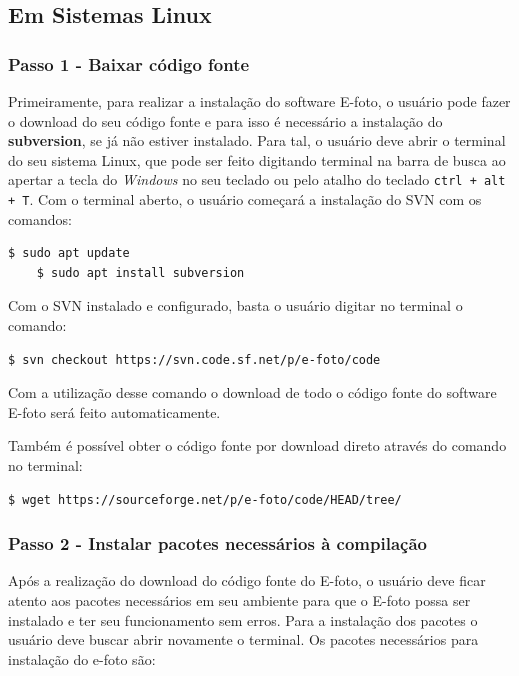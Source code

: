 \subsection{Em Sistemas Linux}

\subsubsection{Passo 1 - Baixar código fonte}
Primeiramente, para realizar a instalação do software E-foto, o usuário pode fazer o download do seu código fonte e para isso é necessário a instalação do \textbf{subversion}, se já não estiver instalado. Para tal, o usuário deve abrir o terminal do seu sistema Linux, que pode ser feito digitando terminal na barra de busca ao apertar a tecla do \textit{Windows} no seu teclado ou pelo atalho do teclado \texttt{ctrl + alt + T}. Com o terminal aberto, o usuário começará a instalação do SVN com os comandos: 
\begin{lstlisting}[language=bash]
	$ sudo apt update
	$ sudo apt install subversion
\end{lstlisting}

Com o SVN instalado e configurado, basta o usuário digitar no terminal o comando:
\begin{lstlisting}[language=bash]
	$ svn checkout https://svn.code.sf.net/p/e-foto/code
\end{lstlisting}

Com a utilização desse comando o download de todo o código fonte do software E-foto será feito automaticamente. 

Também é possível obter o código fonte por download direto através do comando no terminal:

\begin{lstlisting}[language=bash]
	$ wget https://sourceforge.net/p/e-foto/code/HEAD/tree/
\end{lstlisting}
 
\subsubsection{Passo 2 - Instalar pacotes necessários à compilação}  

Após a realização do download do código fonte do E-foto, o usuário deve ficar atento aos pacotes necessários em seu ambiente para que o E-foto possa ser instalado e ter seu funcionamento sem erros. Para a instalação dos pacotes o usuário deve buscar abrir novamente o terminal. Os pacotes necessários para instalação do e-foto são:

